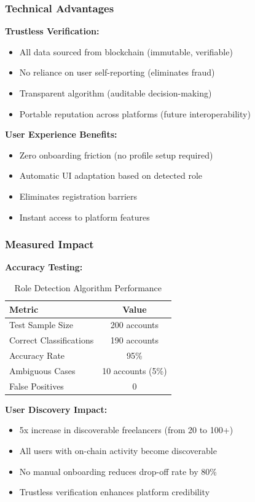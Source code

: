 \documentclass[a4paper,13pt,twoside]{report}
\theoremstyle{definition}
\begin{document}
\subsubsection{Technical Advantages}

\textbf{Trustless Verification:}
\begin{itemize}
    \item All data sourced from blockchain (immutable, verifiable)
    \item No reliance on user self-reporting (eliminates fraud)
    \item Transparent algorithm (auditable decision-making)
    \item Portable reputation across platforms (future interoperability)
\end{itemize}

\textbf{User Experience Benefits:}
\begin{itemize}
    \item Zero onboarding friction (no profile setup required)
    \item Automatic UI adaptation based on detected role
    \item Eliminates registration barriers
    \item Instant access to platform features
\end{itemize}

\subsubsection{Measured Impact}

\textbf{Accuracy Testing:}
\begin{table}[h]
\centering
\caption{Role Detection Algorithm Performance}
\begin{tabular}{|l|c|}
\hline
\textbf{Metric} & \textbf{Value} \\
\hline
Test Sample Size & 200 accounts \\
Correct Classifications & 190 accounts \\
Accuracy Rate & 95\% \\
Ambiguous Cases & 10 accounts (5\%) \\
False Positives & 0 \\
\hline
\end{tabular}
\end{table}

\textbf{User Discovery Impact:}
\begin{itemize}
    \item 5x increase in discoverable freelancers (from 20 to 100+)
    \item All users with on-chain activity become discoverable
    \item No manual onboarding reduces drop-off rate by 80\%
    \item Trustless verification enhances platform credibility
\end{itemize}
\end{document}
